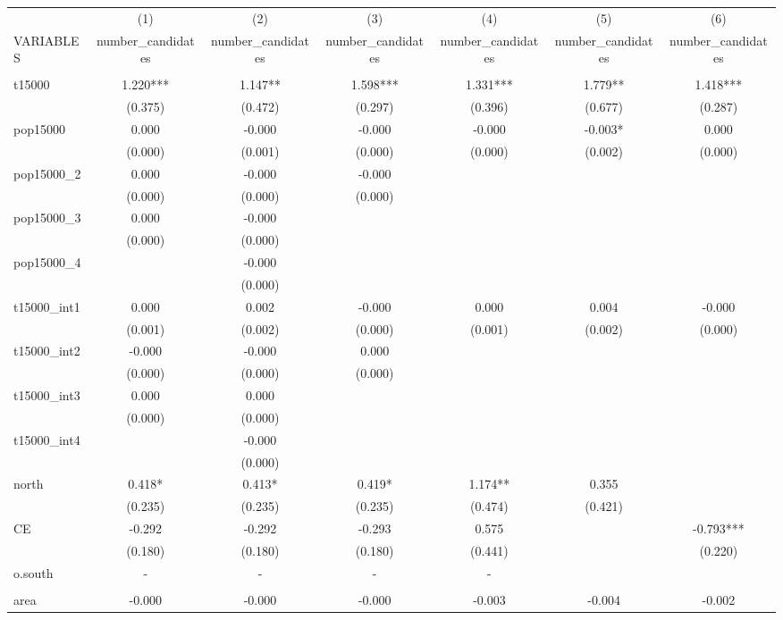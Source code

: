 \documentclass[]{article}
\begin{document}
\begin{tabular}{lcccccc} \hline
 & (1) & (2) & (3) & (4) & (5) & (6) \\
VARIABLES & number\_candidates & number\_candidates & number\_candidates & number\_candidates & number\_candidates & number\_candidates \\ \hline
 &  &  &  &  &  &  \\
t15000 & 1.220*** & 1.147** & 1.598*** & 1.331*** & 1.779** & 1.418*** \\
 & (0.375) & (0.472) & (0.297) & (0.396) & (0.677) & (0.287) \\
pop15000 & 0.000 & -0.000 & -0.000 & -0.000 & -0.003* & 0.000 \\
 & (0.000) & (0.001) & (0.000) & (0.000) & (0.002) & (0.000) \\
pop15000\_2 & 0.000 & -0.000 & -0.000 &  &  &  \\
 & (0.000) & (0.000) & (0.000) &  &  &  \\
pop15000\_3 & 0.000 & -0.000 &  &  &  &  \\
 & (0.000) & (0.000) &  &  &  &  \\
pop15000\_4 &  & -0.000 &  &  &  &  \\
 &  & (0.000) &  &  &  &  \\
t15000\_int1 & 0.000 & 0.002 & -0.000 & 0.000 & 0.004 & -0.000 \\
 & (0.001) & (0.002) & (0.000) & (0.001) & (0.002) & (0.000) \\
t15000\_int2 & -0.000 & -0.000 & 0.000 &  &  &  \\
 & (0.000) & (0.000) & (0.000) &  &  &  \\
t15000\_int3 & 0.000 & 0.000 &  &  &  &  \\
 & (0.000) & (0.000) &  &  &  &  \\
t15000\_int4 &  & -0.000 &  &  &  &  \\
 &  & (0.000) &  &  &  &  \\
north & 0.418* & 0.413* & 0.419* & 1.174** & 0.355 &  \\
 & (0.235) & (0.235) & (0.235) & (0.474) & (0.421) &  \\
CE & -0.292 & -0.292 & -0.293 & 0.575 &  & -0.793*** \\
 & (0.180) & (0.180) & (0.180) & (0.441) &  & (0.220) \\
o.south & - & - & - & - &  &  \\
 &  &  &  &  &  &  \\
area & -0.000 & -0.000 & -0.000 & -0.003 & -0.004 & -0.002 \\

\end{tabular}
\end{document}
